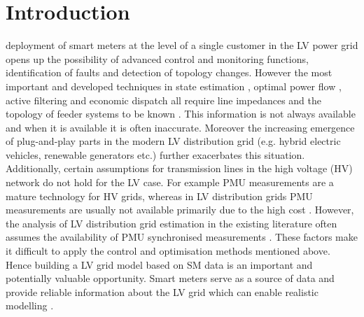 \documentclass[journal,10pt,onecolumn,draftclsnofoot,]{IEEEtran}
\theoremstyle{plain}
\theoremstyle{definition}
\theoremstyle{remark}
\begin{document}
%
\IEEEpeerreviewmaketitle

\section{Introduction}

% 
% 
% 
% 

 deployment of smart meters at the level of a single customer in the LV power grid opens up the possibility of advanced control and monitoring functions, identification of faults and detection of topology changes. However the most important and developed techniques in state estimation \cite{huang2012state, della2014electrical}, optimal power flow \cite{lam2012distributed}, active filtering \cite{tarkiainen2004identification} and economic dispatch all require line impedances and the topology of feeder systems to be known \cite{wood2012power, jahangiri2013distributed}. This information is not always available and when it is available it is often inaccurate. Moreover the increasing emergence of plug-and-play parts in the modern LV distribution grid (e.g. hybrid electric vehicles, renewable generators etc.) further exacerbates this situation. Additionally, certain assumptions for transmission lines in the high voltage (HV) network do not hold for the LV case. For example PMU measurements are a mature technology for HV grids, whereas in LV distribution grids PMU measurements are usually not available primarily due to the high cost \cite{de2010synchronized}. However, the analysis of LV distribution grid estimation in the existing literature often assumes the availability of PMU synchronised measurements \cite{yang2010online, cavraro2015data, deka2016estimating}. These factors make it difficult to apply the control and optimisation methods mentioned above. Hence building a LV grid model based on SM data is an important and potentially valuable opportunity. Smart meters serve as a source of data and provide reliable information about the LV grid which can enable realistic modelling \cite{alahakoon2016smart}. 
\end{document}
